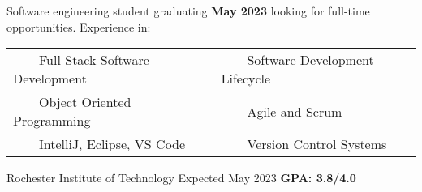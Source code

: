 \documentclass{awesome-cv}
\newcommand{\tabitem}{~~\llap{\textbullet}~~}
\begin{document}
	\makecvheader[C]

	\makecvfooter
		{}
		{}
		{}

		\vspace{-0.1cm}
		
		\begin{center}
		Software engineering student graduating \textbf{May 2023} looking for full-time opportunities. Experience in:
		\vspace{-0.1cm}

		\begin{tabular}{l@{\hskip 2cm}l}
		\tabitem Full Stack Software Development & \tabitem Software Development Lifecycle \\
		\tabitem Object Oriented Programming & \tabitem Agile and Scrum \\
		\tabitem IntelliJ, Eclipse, VS Code & \tabitem Version Control Systems
		\end{tabular}





		\end{center}
		\vspace{-0.25cm}
	
		\vspace{-0.15cm}
		\begin{cventries}
			\cventryB
				{}
				{Rochester Institute of Technology\small{\textnormal{\color{graytext}{\enskip B.S. Software Engineering}}}}
				{Expected May 2023}
				{}
                		{\textbf{GPA: 3.8/4.0}}
		\end{cventries}
		
\end{document}
